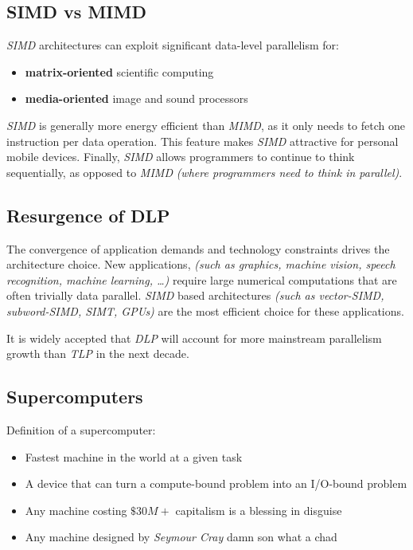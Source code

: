 \documentclass[english]{article}
\begin{document}
\subsection{SIMD vs MIMD}

\textit{SIMD} architectures can exploit significant data-level parallelism for:

\begin{itemize}
  \item \textbf{matrix-oriented} scientific computing
  \item \textbf{media-oriented} image and sound processors
\end{itemize}

\textit{SIMD} is generally more energy efficient than \textit{MIMD}, as it only needs to fetch one instruction per data operation.
This feature makes \textit{SIMD} attractive for personal mobile devices.
Finally, \textit{SIMD} allows programmers to continue to think sequentially, as opposed to \textit{MIMD} \textit{(where programmers need to think in parallel)}.

\subsection{Resurgence of DLP}

The convergence of application demands and technology constraints drives the architecture choice.
New applications, \textit{(such as graphics, machine vision, speech recognition, machine learning, \ldots)} require large numerical computations that are often trivially data parallel.
\textit{SIMD} based architectures \textit{(such as vector-SIMD, subword-SIMD, SIMT, GPUs)} are the most efficient choice for these applications.

It is widely accepted that \textit{DLP} will account for more mainstream parallelism growth than \textit{TLP} in the next decade.

\subsection{Supercomputers}

Definition of a supercomputer:

\begin{itemize}
  \item Fastest machine in the world at a given task
  \item A device that can turn a compute-bound problem into an I/O-bound problem
  \item Any machine costing \(\$30M+\) {\tiny capitalism is a blessing in disguise}
  \item Any machine designed by \textit{Seymour Cray} {\tiny damn son what a chad}
\end{itemize}
\end{document}
